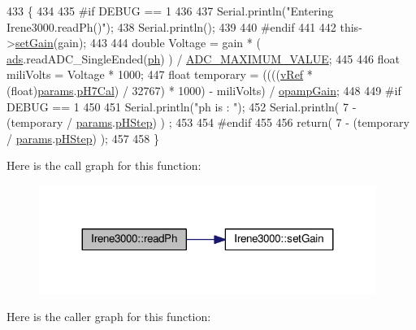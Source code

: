 \begin{DoxyCode}
433 \{
434 
435 \textcolor{preprocessor}{#if DEBUG == 1 }
436 
437     Serial.println(\textcolor{stringliteral}{"Entering Irene3000.readPh()"});
438     Serial.println();
439 
440 \textcolor{preprocessor}{#endif }
441 
442     this->\hyperlink{classIrene3000_aff7c5da186b388e7272e63ff88a20c34}{setGain}(gain);
443 
444     \textcolor{keywordtype}{double} Voltage =  gain * ( \hyperlink{classIrene3000_a1215e77ba761c9908d80d691f149e135}{ads}.readADC\_SingleEnded(\hyperlink{Irene3000_8h_af771ceafe0e6524dd8497d4305dfe778}{ph}) ) / 
      \hyperlink{Irene3000_8h_ae04444a85a37b5dce09107f2ce2b2c80}{ADC\_MAXIMUM\_VALUE};
445 
446     \textcolor{keywordtype}{float} miliVolts = Voltage * 1000;
447     \textcolor{keywordtype}{float} temporary = ((((\hyperlink{classIrene3000_a018e7ff9bee57e6d2b298667a668ba7e}{vRef} * (float)\hyperlink{classIrene3000_a136585a5ee7f9ac6ab52175fa153f8e3}{params}.\hyperlink{structIrene3000_1_1parameters__T_a21265466a570d84bff914f26d2f7a03e}{pH7Cal}) / 32767) * 1000) - miliVolts) / 
      \hyperlink{classIrene3000_a4e588985ca74e5076029d5dee81034f2}{opampGain};
448 
449 \textcolor{preprocessor}{#if DEBUG == 1 }
450 
451     Serial.println(\textcolor{stringliteral}{"ph is : "});
452     Serial.println( 7 - (temporary / \hyperlink{classIrene3000_a136585a5ee7f9ac6ab52175fa153f8e3}{params}.\hyperlink{structIrene3000_1_1parameters__T_a61cfcc2539d5f630e9071f3753aba9fe}{pHStep}) ) ;
453 
454 \textcolor{preprocessor}{#endif }
455 
456     \textcolor{keywordflow}{return}( 7 - (temporary / \hyperlink{classIrene3000_a136585a5ee7f9ac6ab52175fa153f8e3}{params}.\hyperlink{structIrene3000_1_1parameters__T_a61cfcc2539d5f630e9071f3753aba9fe}{pHStep}) );
457 
458 \}
\end{DoxyCode}
Here is the call graph for this function\+:\nopagebreak
\begin{figure}[H]
\begin{center}
\leavevmode
\includegraphics[width=311pt]{classIrene3000_abf3db725fabb0634ec889b32068a5eec_cgraph}
\end{center}
\end{figure}
Here is the caller graph for this function\+:\nopagebreak
